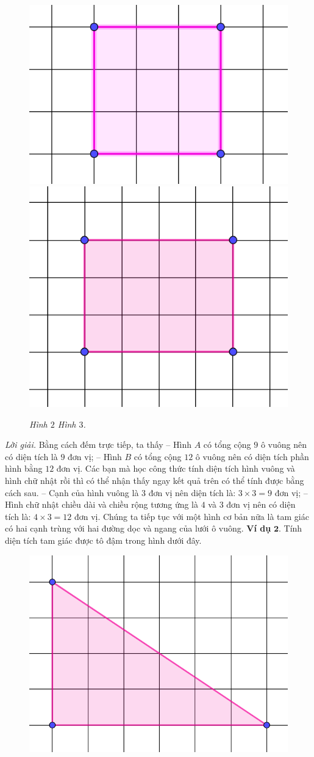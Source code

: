 \begin{multicols}{2}
	\begin{figure}[H]
		\centering
		\vspace*{-10pt}
		\captionsetup{labelformat= empty, justification=centering}
		\includegraphics[width=0.4\linewidth]{2}
		\includegraphics[width=0.45\linewidth]{3}
		\caption{\small\textit{\color{toancuabi}Hình $2$ \hspace*{40pt}Hình $3$.}}
		\vspace*{-15pt}
	\end{figure}
	\textit{Lời giải.} Bằng cách đếm trực tiếp, ta thấy
	\vskip 0.1cm
	-- Hình $A$ có tổng cộng $9$ ô vuông nên có diện tích là $9$ đơn vị;
	\vskip 0.1cm
	-- Hình $B$ có tổng cộng $12$ ô vuông nên có diện tích phần hình bằng $12$ đơn vị.
	\vskip 0.1cm
	Các bạn mà học công thức tính diện tích hình vuông và hình chữ nhật rồi thì có thể nhận thấy ngay kết quả trên có thể tính được bằng cách sau.
	\vskip 0.1cm
	-- Cạnh của hình vuông là $3$ đơn vị nên diện tích là: $3 \times  3 = 9$ đơn vị;
	\vskip 0.1cm
	-- Hình chữ nhật chiều dài và chiều rộng tương ứng là $4$ và $3$ đơn vị nên có diện tích là: $4 \times  3 = 12$ đơn vị.
	\vskip 0.1cm
	Chúng ta tiếp tục với một hình cơ bản nữa là tam giác có hai cạnh trùng với hai đường dọc và ngang của lưới ô vuông.
	\vskip 0.1cm
	\textbf{\color{toancuabi}Ví dụ} $\pmb{2.}$ Tính diện tích tam giác được tô đậm trong hình dưới đây.
	\begin{figure}[H]
		\centering
		\vspace*{-5pt}
		\captionsetup{labelformat= empty, justification=centering}
		\includegraphics[width=0.5\linewidth]{4}

\end{figure}
\end{multicols}
